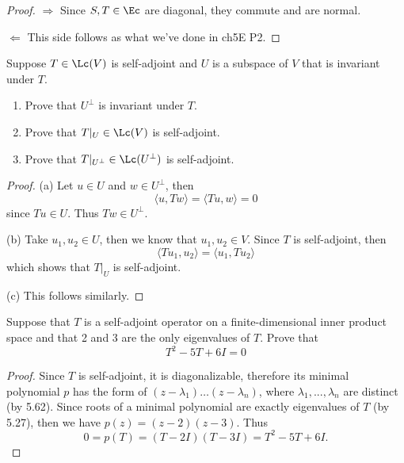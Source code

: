 \documentclass{extarticle}
\begin{document}
\begin{proof}
\(\Rightarrow\) Since \(S, T \in \Ec\) are diagonal, they commute and are normal.

\(\Leftarrow\) This side follows as what we've done in ch5E P2.
\end{proof}

\begin{problem}{19}
    Suppose \(T \in \Lc(V)\) is self-adjoint and \(U\) is a subspace of \(V\) that is invariant
    under \(T\).
    \begin{enumerate}[label=(\alph*)]
        \item Prove that \(U^\perp\) is invariant under \(T\).
        \item Prove that \(T|_U \in \Lc(V)\) is self-adjoint.
        \item Prove that \(T |_{U^\perp} \in \Lc(U^\perp)\) is self-adjoint.
    \end{enumerate}
\end{problem}

\begin{proof}
(a) Let \(u \in U\) and \(w \in U^\perp\), then
\[\langle u,Tw \rangle = \langle Tu,w \rangle = 0\]
since \(Tu \in U\). Thus \(Tw \in U^\perp\).

(b) Take \(u_1, u_2 \in U\), then we know that \(u_1, u_2 \in V\). Since \(T\) is self-adjoint, then
\[\langle Tu_1, u_2 \rangle = \langle u_1,Tu_2 \rangle\]
which shows that \(T|_U\) is self-adjoint.

(c) This follows similarly.
\end{proof}

\begin{problem}{21}
    Suppose that \(T\) is a self-adjoint operator on a finite-dimensional inner product space and
    that 2 and 3 are the only eigenvalues of \(T\). Prove that
    \[T^2 - 5T + 6I = 0\]
\end{problem}

\begin{proof}
    Since \( T \) is self-adjoint, it is diagonalizable, therefore its minimal polynomial \( p \)
    has the form of \( (z - \lambda_1) \ldots (z - \lambda_n) \),
    where \( \lambda_1, ..., \lambda_n \) are distinct (by 5.62). Since roots of a minimal
    polynomial are exactly eigenvalues of \( T \) (by 5.27),
    then we have \( p(z) = (z - 2)(z - 3) \). Thus
    \begin{equation*}
        0 = p(T) = (T - 2I)(T - 3I) = T^2 - 5T + 6I.
    \end{equation*}
\end{proof}
\end{document}
